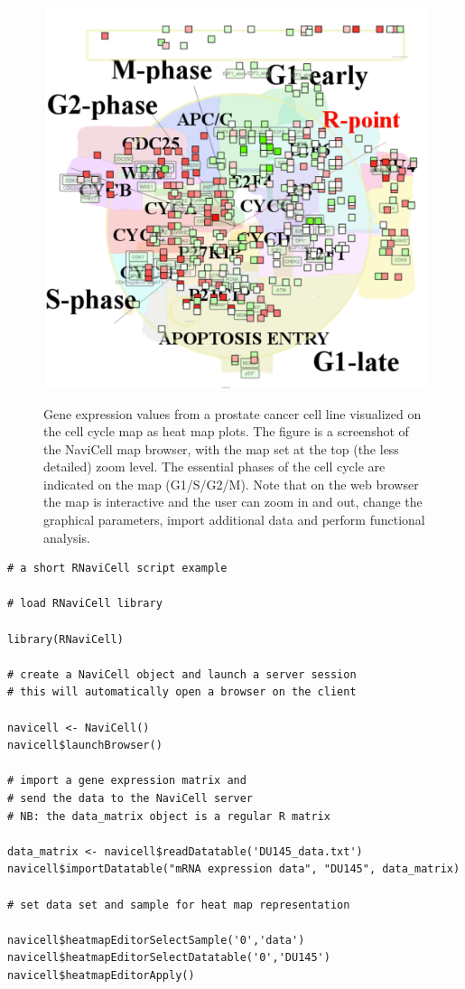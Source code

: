 \documentclass{article}
\begin{document}
\begin{figure}[!ht]
  \caption{Gene expression values from a prostate cancer cell line visualized
on the cell cycle map as heat map plots. The figure is a screenshot of the
NaviCell map browser, with the map set at the top (the less detailed) zoom
level. The essential phases of the cell cycle are indicated on the map
(G1/S/G2/M). Note that on the web browser the map is interactive and the user
can zoom in and out, change the graphical parameters, import additional data
and perform functional analysis.  } 
\centering
  \includegraphics[width=\textwidth]{figures/heatmap.pdf}
  \label{fig:du145}
\end{figure}



\begin{verbatim}
# a short RNaviCell script example

# load RNaviCell library

library(RNaviCell)

# create a NaviCell object and launch a server session
# this will automatically open a browser on the client 

navicell <- NaviCell()
navicell$launchBrowser()

# import a gene expression matrix and 
# send the data to the NaviCell server
# NB: the data_matrix object is a regular R matrix

data_matrix <- navicell$readDatatable('DU145_data.txt')
navicell$importDatatable("mRNA expression data", "DU145", data_matrix)

# set data set and sample for heat map representation

navicell$heatmapEditorSelectSample('0','data')
navicell$heatmapEditorSelectDatatable('0','DU145')
navicell$heatmapEditorApply()

\end{verbatim}
\end{document}
